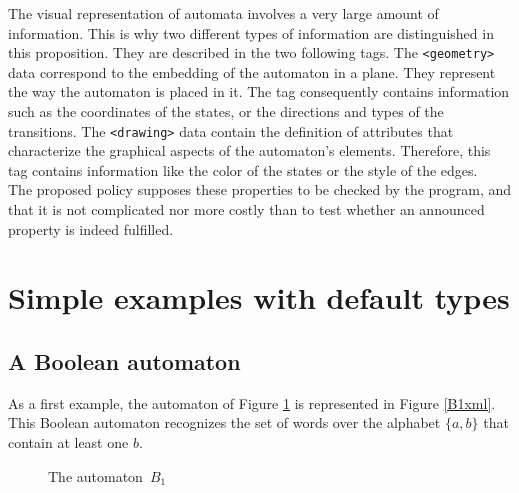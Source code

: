 \documentclass[a4paper]{llncs}
\newcommand{\medskipneg}{\vspace*{-2ex}} %
\def\geometrytag{\texttt{<geometry>}}
\def\drawingtag{\texttt{<drawing>}}
\begin{document}
The visual representation of automata involves a very large amount of
information. This is why two different types of information are
distinguished in this proposition. They are described in the two following tags.
 The \geometrytag{} data correspond to the embedding
of the automaton in a plane. They represent the way the automaton is placed in
it. The tag consequently contains information such as the coordinates of the
states, or the directions and types of the transitions. The \drawingtag{} data
contain the definition of attributes that characterize the graphical aspects of the
automaton's elements. Therefore, this tag contains information like the color of the
states or the style of the edges. \\

The proposed policy supposes these properties to be checked by the program, and that it is
not complicated nor more costly than to test whether an announced property is indeed fulfilled.

\section{Simple examples with default types}
\subsection{A Boolean automaton}

As a first example, the automaton of Figure \ref{B1} is represented in
Figure \ref{B1xml}. This Boolean automaton recognizes the set of
words over the alphabet $\{a,b\}$ that contain at least one $b$.\\

\begin{figure}[ht]
\begin{center}
\end{center}
\vspace*{-.8cm}
\caption{The automaton~$B_1$}\label{B1}
\medskipneg
\end{figure}
\end{document}
